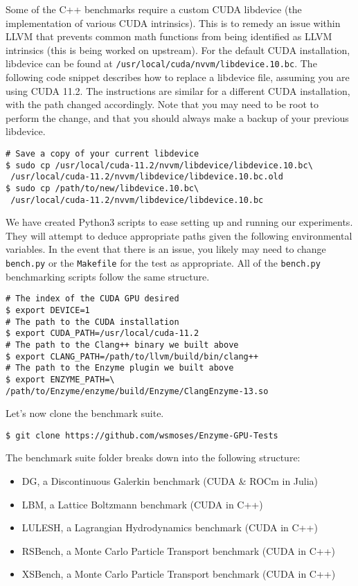 Some of the C++ benchmarks require a custom CUDA libdevice (the implementation of various CUDA intrinsics). This is to remedy an issue within LLVM that prevents common math functions from being identified as LLVM intrinsics (this is being worked on upstream). For the default CUDA installation, libdevice can be found at \verb|/usr/local/cuda/nvvm/libdevice.10.bc|. The following code snippet describes how to replace a libdevice file, assuming you are using CUDA 11.2. The instructions are similar for a different CUDA installation, with the path changed accordingly. Note that you may need to be root to perform the change, and that you should always make a backup of your previous libdevice.

\begin{verbatim}
# Save a copy of your current libdevice
$ sudo cp /usr/local/cuda-11.2/nvvm/libdevice/libdevice.10.bc\
 /usr/local/cuda-11.2/nvvm/libdevice/libdevice.10.bc.old
$ sudo cp /path/to/new/libdevice.10.bc\
 /usr/local/cuda-11.2/nvvm/libdevice/libdevice.10.bc
\end{verbatim}

We have created Python3 scripts to ease setting up and running our experiments. They will attempt to deduce appropriate paths given the following environmental variables. In the event that there is an issue, you likely may need to change \verb|bench.py| or the \verb|Makefile| for the test as appropriate. All of the \verb|bench.py| benchmarking scripts follow the same structure.

\begin{verbatim}
# The index of the CUDA GPU desired
$ export DEVICE=1
# The path to the CUDA installation
$ export CUDA_PATH=/usr/local/cuda-11.2
# The path to the Clang++ binary we built above
$ export CLANG_PATH=/path/to/llvm/build/bin/clang++
# The path to the Enzyme plugin we built above
$ export ENZYME_PATH=\
/path/to/Enzyme/enzyme/build/Enzyme/ClangEnzyme-13.so
\end{verbatim}

Let's now clone the benchmark suite.

\begin{verbatim}
$ git clone https://github.com/wsmoses/Enzyme-GPU-Tests
\end{verbatim}

The benchmark suite folder breaks down into the following structure:

\begin{itemize}
    \item DG, a Discontinuous Galerkin benchmark (CUDA \& ROCm in Julia)
    \item LBM, a Lattice Boltzmann benchmark (CUDA in C++)
    \item LULESH, a Lagrangian Hydrodynamics benchmark (CUDA in C++)
    \item RSBench, a Monte Carlo Particle Transport benchmark (CUDA in C++)
    \item XSBench, a Monte Carlo Particle Transport benchmark (CUDA in C++)
\end{itemize}

